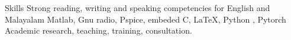 
\begin{rubric}{Skills}
\entry*[Languages]
	Strong reading, writing and speaking competencies for English and Malayalam  
	Matlab, Gnu radio, Pspice, embeded C, LaTeX, Python , Pytorch
\entry*[Misc.]
	Academic research, teaching, training, consultation.
\end{rubric}
